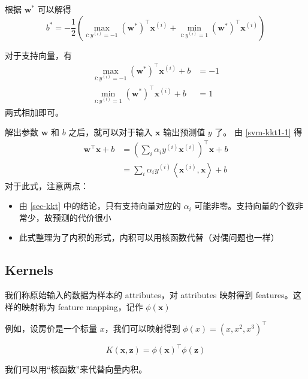 		根据 $ \bm{w}^* $ 可以解得
		\begin{equation}
			b^* = - \frac{1}{2} \left( \max_{i: y^{(i)} = -1} (\bm{w}^*)^\intercal \bm{x}^{(i)} + \min_{i: y^{(i)} = 1} (\bm{w}^*)^\intercal \bm{x}^{(i)} \right) \label{svm-commonly-solving-b}
		\end{equation}
		\begin{pf}
			对于支持向量，有
			\begin{align*}
				\max_{i: y^{(i)} = -1} (\bm{w}^*)^\intercal \bm{x}^{(i)} + b & = -1 \\
				\min_{i: y^{(i)} = 1} (\bm{w}^*)^\intercal \bm{x}^{(i)} + b & = 1
			\end{align*}
			两式相加即可。
		\end{pf}
		
		解出参数 $ \bm{w} $ 和 $ b $ 之后，就可以对于输入 $ \bm{x} $ 输出预测值 $ y $ 了。
		由 \eqref{svm-kkt1-1} 得
		\begin{align}
			\bm{w}^\intercal \bm{x} + b &= \left( \sum_i \alpha_i y^{(i)} \bm{x}^{(i)} \right)^\intercal \bm{x} + b \\
			&= \sum_i \alpha_i y^{(i)} \left\langle \bm{x}^{(i)}, \bm{x} \right\rangle + b
		\end{align}
		对于此式，注意两点：
		\begin{itemize}
			\item 由 \ref{sec-kkt} 中的结论，只有支持向量对应的 $ \alpha_i $ 可能非零。支持向量的个数非常少，故预测的代价很小
			\item 此式整理为了内积的形式，内积可以用核函数代替（对偶问题也一样）
		\end{itemize}
		
	\subsection{Kernels}
	\begin{df}
		我们称原始输入的数据为样本的 attributes，对 attributes 映射得到 features。这样的映射称为 feature mapping，记作 $ \phi(\bm{x}) $
	\end{df}
	例如，设房价是一个标量 $ x $，我们可以映射得到 $ \phi(x) = {\left( x, x^2, x^3  \right)} ^\intercal $
	
	\begin{df}
		\begin{equation*}
			K(\bm{x}, \bm{z}) = \phi(\bm{x})^\intercal \phi(\bm{z})
		\end{equation*}
	\end{df}
	我们可以用“核函数”来代替向量内积。
	
